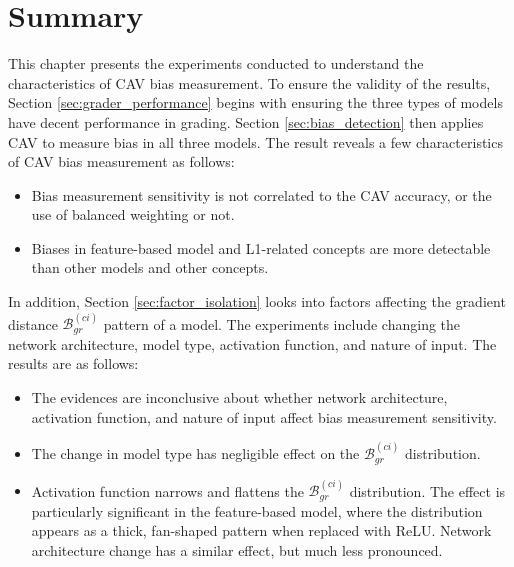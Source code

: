 \section{Summary}
This chapter presents the experiments conducted to understand the characteristics of CAV bias measurement. To ensure the validity of the results, Section \ref{sec:grader_performance} begins with ensuring the three types of models have decent performance in grading. Section \ref{sec:bias_detection} then applies CAV to measure bias in all three models. The result reveals a few characteristics of CAV bias measurement as follows:

\begin{itemize}
    \item Bias measurement sensitivity is not correlated to the CAV accuracy, or the use of balanced weighting or not.
    \item Biases in feature-based model and L1-related concepts are more detectable than other models and other concepts.
\end{itemize}

In addition, Section \ref{sec:factor_isolation} looks into factors affecting the gradient distance $\mathcal{B}_{gr}^{(ci)}$ pattern of a model. The experiments include changing the network architecture, model type, activation function, and nature of input. The results are as follows:

\begin{itemize}
    \item The evidences are inconclusive about whether network architecture, activation function, and nature of input affect bias measurement sensitivity.
    \item The change in model type has negligible effect on the $\mathcal{B}_{gr}^{(ci)}$ distribution.
    \item Activation function narrows and flattens the $\mathcal{B}_{gr}^{(ci)}$ distribution. The effect is particularly significant in the feature-based model, where the distribution appears as a thick, fan-shaped pattern when replaced with ReLU. Network architecture change has a similar effect, but much less pronounced.
\end{itemize}

